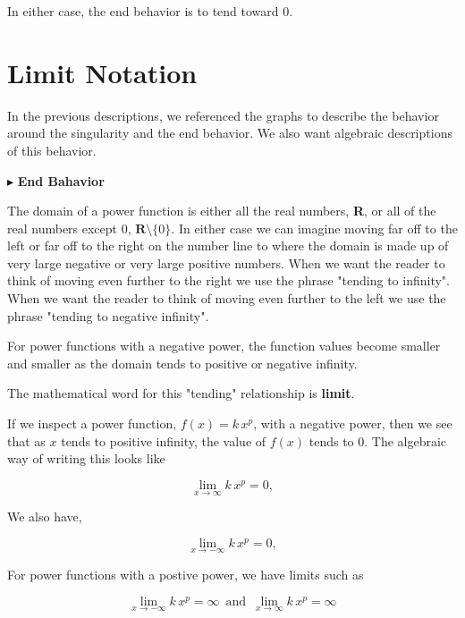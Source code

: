 \documentclass{ximera}
\begin{document}
In either case, the end behavior is to tend toward $0$.











\section{Limit Notation }



In the previous descriptions, we referenced the graphs to describe the behavior around the singularity and the end behavior.  We also want algebraic descriptions of this behavior.


$\blacktriangleright$  \textbf{End Bahavior}

The domain of a power function is either all the real numbers, \textbf{R}, or all of the real numbers except $0$, $\textbf{R} \setminus \{ 0 \}$.  In either case we can imagine moving far off to the left or far off to the right on the number line to where the domain is made up of very large negative or very large positive numbers.  When we want the reader to think of moving even further to the right we use the phrase "tending to infinity". When we want the reader to think of moving even further to the left we use the phrase "tending to negative infinity".

For power functions with a negative power, the function values become smaller and smaller as the domain tends to positive or negative infinity.

The mathematical word for this "tending" relationship is \textbf{limit}.

If we inspect a power function, $f(x) = k \, x^p$, with a negative power, then we see that as $x$ tends to positive infinity, the value of $f(x)$ tends to $0$.  The algebraic way of writing this looks like


\[    \lim_{x \to \infty} k \, x^p = 0,        \]


We also have,

\[    \lim_{x \to -\infty} k \, x^p = 0,        \]



For power functions with a postive power, we have limits such as 



\[    \lim_{x \to -\infty} k \, x^p =  \infty  \,   \text{ and }  \,     \lim_{x \to \infty} k \, x^p = \infty      \]
\end{document}
